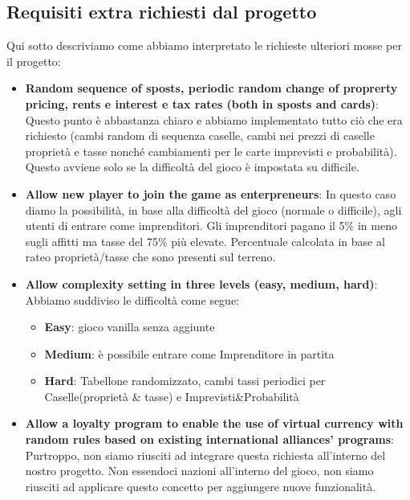\documentclass{article}
\begin{document}
\subsection{Requisiti extra richiesti dal progetto}
Qui sotto descriviamo come abbiamo interpretato le richieste ulteriori mosse per il progetto:
\begin{itemize}
	\item \textbf{Random sequence of sposts, periodic random change of proprerty pricing, rents e interest e tax rates (both in sposts and cards)}: 
		Questo punto è abbastanza chiaro e abbiamo implementato tutto ciò che era richiesto (cambi random di sequenza caselle, cambi nei prezzi di caselle proprietà e tasse nonché cambiamenti per le carte imprevisti e probabilità).
	Questo avviene solo se la difficoltà del gioco è impostata su difficile.
	
	\item \textbf{Allow new player to join the game as enterpreneurs}: 
		In questo caso diamo la possibilità, in base alla difficoltà del gioco (normale o difficile), agli utenti di entrare come imprenditori. Gli imprenditori pagano il 5\% in meno sugli affitti ma tasse del 75\% più elevate.
	Percentuale calcolata in base al rateo proprietà/tasse che sono presenti sul terreno.
	
	\item \textbf{Allow complexity setting in three levels (easy, medium, hard)}: 
		Abbiamo suddiviso le difficoltà come segue:
		\begin{itemize}
			\item \textbf{Easy}: gioco vanilla senza aggiunte
			\item \textbf{Medium}: è possibile entrare come Imprenditore in partita
			\item \textbf{Hard}: Tabellone randomizzato, cambi tassi periodici per Caselle(proprietà \& tasse) e Imprevisti\&Probabilità	
		\end{itemize}
		
	\item \textbf{Allow a loyalty program to enable the use of virtual currency with random rules based on existing international alliances' programs}: 
	Purtroppo, non siamo riusciti ad integrare questa richiesta all'interno del nostro progetto. Non essendoci nazioni all'interno del gioco, non siamo riusciti ad applicare questo concetto per aggiungere nuove funzionalità.

		
\end{itemize}	
\end{document}
